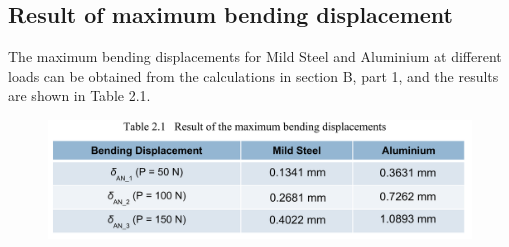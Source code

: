 \subsection{Result of maximum bending displacement}
The maximum bending displacements for Mild Steel and Aluminium at different loads can be obtained from the calculations in section B, part 1, and the results are shown in Table 2.1.
\begin{figure}[htp]
	\centering
	\includegraphics[width=1.0\linewidth]{Results_and_discussion/Figure/RESULT}
    \caption*{}
    \label{T 2.1}
\end{figure}


\FloatBarrier %